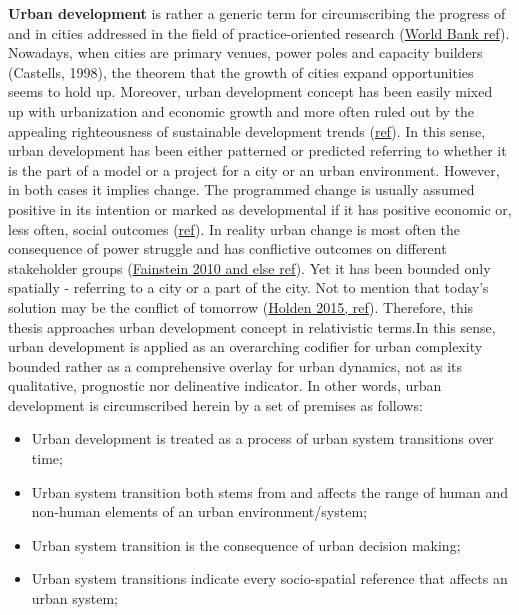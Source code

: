 \documentclass[11pt]{report}
\begin{document}
\textbf{Urban development} is rather a generic term for circumscribing the progress of and in cities addressed in the  field of practice-oriented research (\href{ref}{World Bank ref}). Nowadays, when cities are primary venues, power poles and capacity builders (Castells, 1998), the theorem that the growth of cities expand opportunities seems to hold up. Moreover, urban development concept has been easily mixed up with urbanization and economic growth and more often ruled out by the appealing righteousness of sustainable development trends (\href{ref}{ref}).  In this sense, urban development has been either patterned or predicted referring to whether it is the part of a model or a project for a city or an urban environment. However, in both cases it implies change. The programmed change is usually assumed positive in its intention or marked as developmental if it has positive economic or, less often, social outcomes (\href{ref}{ref}). In reality urban change is most often the consequence of power struggle and has conflictive outcomes on different stakeholder groups (\href{ref}{Fainstein 2010 and else ref}). Yet it has been bounded only spatially - referring to a city or a part of the city. Not to mention that today's solution may be the conflict of tomorrow (\href{ref}{Holden 2015, ref}).
Therefore, this thesis approaches urban development concept in relativistic terms.\footnotemark In this sense, urban development is applied as an overarching codifier for urban complexity bounded rather as a comprehensive overlay for urban dynamics, not as its qualitative, prognostic nor delineative indicator. In other words,  urban development is circumscribed herein by a set of premises as follows:
\begin{itemize}
\item Urban development is treated as a process of urban system transitions over time;
\item Urban system transition both stems from and affects the range of human and non-human elements of an urban environment/system;
\item Urban system transition is the consequence of urban decision making;
\item Urban system transitions indicate every socio-spatial reference that affects an urban system;
\end {itemize}
\end{document}
